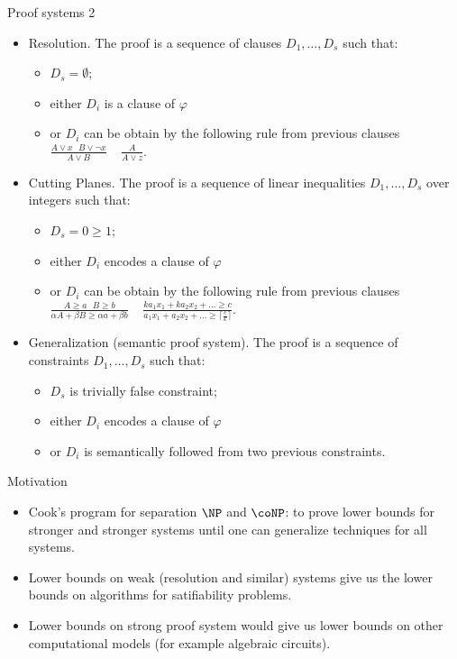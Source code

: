 \begin{frame}{Proof systems 2}
    \begin{itemize}
        \item Resolution. The proof is a sequence of clauses $D_1, \dots, D_s$ such that:
            \begin{itemize}
                \item $D_s = \emptyset$;
                \item either $D_i$ is a clause of $\varphi$
                \item or $D_i$ can be obtain by the following rule from previous clauses $\frac{A \lor x ~~~ B \lor \neg x}{A
                    \lor B} ~~~~~ \frac{A}{A \lor z}$.
            \end{itemize}
        \pause
        \item Cutting Planes. The proof is a sequence of linear inequalities $D_1, \dots, D_s$ over integers such that:
            \begin{itemize}
                \item $D_s = 0 \ge 1$;
                \item either $D_i$ encodes a clause of $\varphi$
                \item or $D_i$ can be obtain by the following rule from previous clauses $\frac{A \ge a ~~~ B \ge b}{\alpha A
                    + \beta B \ge \alpha a + \beta b} ~~~~~ \frac{ka_1 x_1 + ka_2 x_2 + \dots \ge c}{a_1 x_1 + a_2 x_2 +
                    \dots \ge \lceil \frac{c}{k} \rceil}$.
            \end{itemize}
        \pause
        \item Generalization (semantic proof system). The proof is a sequence of constraints $D_1, \dots, D_s$ such that:
            \begin{itemize}
                \item $D_s$ is trivially false constraint;
                \item either $D_i$ encodes a clause of $\varphi$
                \item or $D_i$ is semantically followed from two previous constraints.
            \end{itemize}
    \end{itemize}
\end{frame}


\begin{frame}{Motivation}
    \begin{itemize}
        \item Cook's program for separation $\NP$ and $\coNP$: to prove lower bounds for {\color{blue}
            stronger and stronger} systems until one can generalize techniques for all systems.
        \pause
        \item Lower bounds on {\color{blue} weak} (resolution and similar) systems give us the lower
            bounds on algorithms for satifiability problems.
        \pause
        \item Lower bounds on {\color{blue} strong} proof system would give us lower bounds on other
            computational models (for example algebraic circuits).
    \end{itemize}
\end{frame}
